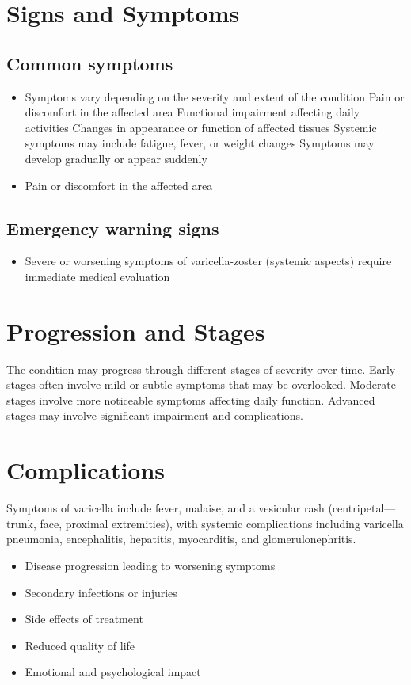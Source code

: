 \section{Signs and Symptoms}

\subsection{Common symptoms}
\begin{itemize}[noitemsep]
  \item Symptoms vary depending on the severity and extent of the condition Pain or discomfort in the affected area Functional impairment affecting daily activities Changes in appearance or function of affected tissues Systemic symptoms may include fatigue, fever, or weight changes Symptoms may develop gradually or appear suddenly
  \item Pain or discomfort in the affected area
  \end{itemize}

\subsection{Emergency warning signs}
\begin{itemize}[noitemsep]
  \item Severe or worsening symptoms of varicella-zoster (systemic aspects) require immediate medical evaluation
\end{itemize}
\section{Progression and Stages}
The condition may progress through different stages of severity over time. Early stages often involve mild or subtle symptoms that may be overlooked. Moderate stages involve more noticeable symptoms affecting daily function. Advanced stages may involve significant impairment and complications.
\section{Complications}
Symptoms of varicella include fever, malaise, and a vesicular rash (centripetal---trunk, face, proximal extremities), with systemic complications including varicella pneumonia, encephalitis, hepatitis, myocarditis, and glomerulonephritis.

\begin{itemize}[noitemsep]
  \item Disease progression leading to worsening symptoms
  \item Secondary infections or injuries
  \item Side effects of treatment
  \item Reduced quality of life
  \item Emotional and psychological impact
\end{itemize}
